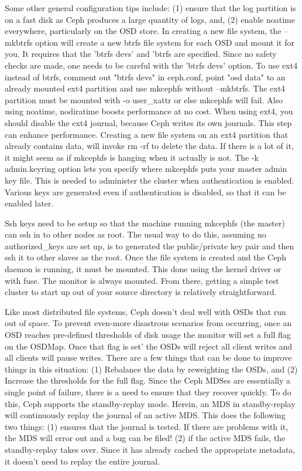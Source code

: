 \documentclass[11pt]{article}
\begin{document}
Some other general configuration tips include: (1) ensure that the log 
partition is on a fast disk as Ceph produces a large quantity of logs, 
and, (2) enable noatime everywhere, particularly on the OSD store.
In creating a new file system, the --mkbtrfs option will create a new 
btrfs file system for each OSD and mount it for you. It requires that 
the 'btrfs devs' and 'btrfs are specified. Since no safety checks are 
made, one needs to be careful with the 'btrfs devs' option. To use ext4 
instead of btrfs, comment out "btrfs devs" in ceph.conf, point "osd data" 
to an already mounted ext4 partition and use mkcephfs without --mkbtrfs. 
The ext4 partition must be mounted with -o user_xattr or else mkcephfs 
will fail. Also using noatime, nodiratime boosts performance at no cost. 
When using ext4, you should disable the ext4 journal, because Ceph writes 
its own journals. This step can enhance performance.  Creating a new file 
system on an ext4 partition that already contains data, will invoke rm -rf 
to delete the data. If there is a lot of it, it might seem as if mkcephfs 
is hanging when it actually is not. 
The -k admin.keyring option lets you specify where mkcephfs puts your master 
admin key file. This is needed to administer the cluster when authentication 
is enabled. Various keys are generated even if authentication is disabled, 
so that it can be enabled later. 

Ssh keys need to be setup so that the machine running mkcephfs  (the master) 
can ssh in to other nodes  as root. The usual way to do this, assuming  no 
authorized_keys are set up, is to generated the public/private key pair and 
then ssh it to other slaves as the root. Once the file system is created and 
the Ceph daemon is running, it must be mounted. This done using  the kernel 
driver or with fuse. The monitor is always mounted. From there, getting a 
simple test cluster to start up out of your source directory is relatively 
straightforward.

Like most distributed file systems, Ceph doesn't deal well with OSDs that 
run out of space. To prevent even-more disastrous scenarios from occurring, 
once an OSD reaches pre-defined thresholds of disk usage the monitor will 
set a full flag on the OSDMap. Once that flag is set’ the OSDs will reject  
all client writes and all clients will pause writes. There are a few things 
that can be done to improve things in this situation:  (1) Rebalance the data 
by reweighting the OSDs, and (2) Increase the thresholds for the full flag.
Since the Ceph MDSes are essentially a single point of failure, there is a 
need to ensure that they recover quickly. To do this, Ceph supports the 
standby-replay mode. Herein, an MDS in standby-replay will continuously 
replay the journal of an active MDS. This does the following two things: 
(1) ensures that the journal is tested. If there are problems with it, the 
MDS will error out and a bug can be filed! (2) if the active MDS fails, the 
standby-replay takes over. Since it has already cached the appropriate 
metadata, it doesn't need to replay the entire journal.
\end{document}
